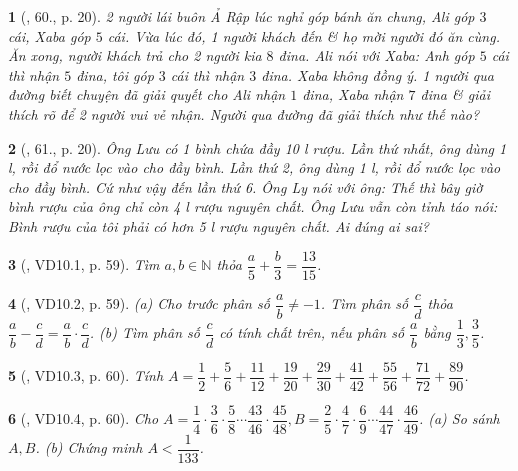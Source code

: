 \documentclass{article}
\newtheorem{baitoan}{}
\begin{document}
\begin{baitoan}[\cite{Binh_Toan_6_tap_2}, 60., p. 20]
	2 người lái buôn Ả Rập lúc nghỉ góp bánh ăn chung, Ali góp $3$ cái, Xaba góp $5$ cái. Vừa lúc đó, 1 người khách đến \& họ mời người đó ăn cùng. Ăn xong, người khách trả cho 2 người kia $8$ đina. Ali nói với Xaba: Anh góp $5$ cái thì nhận $5$ đina, tôi góp $3$ cái thì nhận $3$ đina. Xaba không đồng ý. 1 người qua đường biết chuyện đã giải quyết cho Ali nhận $1$ đina, Xaba nhận $7$ đina \& giải thích rõ để 2 người vui vẻ nhận. Người qua đường đã giải thích như thế nào?
\end{baitoan}

\begin{baitoan}[\cite{Binh_Toan_6_tap_2}, 61., p. 20]
	Ông Lưu có 1 bình chứa đầy {\rm10 l} rượu. Lần thứ nhất, ông dùng {\rm1 l}, rồi đổ nước lọc vào cho đầy bình. Lần thứ 2, ông dùng {\rm1 l}, rồi đổ nước lọc vào cho đầy bình. Cứ như vậy đến lần thứ 6. Ông Ly nói với ông: Thế thì bây giờ bình rượu của ông chỉ còn {\rm4 l} rượu nguyên chất. Ông Lưu vẫn còn tỉnh táo nói: Bình rượu của tôi phải có hơn {\rm5 l} rượu nguyên chất. Ai đúng ai sai?
\end{baitoan}

\begin{baitoan}[\cite{TLCT_THCS_Toan_6_so_hoc}, VD10.1, p. 59]
	Tìm $a,b\in\mathbb{N}$ thỏa $\dfrac{a}{5} + \dfrac{b}{3} = \dfrac{13}{15}$.
\end{baitoan}

\begin{baitoan}[\cite{TLCT_THCS_Toan_6_so_hoc}, VD10.2, p. 59]
	(a) Cho trước phân số $\dfrac{a}{b}\ne-1$. Tìm phân số $\dfrac{c}{d}$ thỏa $\dfrac{a}{b} - \dfrac{c}{d} = \dfrac{a}{b}\cdot\dfrac{c}{d}$. (b) Tìm phân số $\dfrac{c}{d}$ có tính chất trên, nếu phân số $\dfrac{a}{b}$ bằng $\dfrac{1}{3},\dfrac{3}{5}$.
\end{baitoan}

\begin{baitoan}[\cite{TLCT_THCS_Toan_6_so_hoc}, VD10.3, p. 60]
	Tính $A = \dfrac{1}{2} + \dfrac{5}{6} + \dfrac{11}{12} + \dfrac{19}{20} + \dfrac{29}{30} + \dfrac{41}{42} + \dfrac{55}{56} + \dfrac{71}{72} + \dfrac{89}{90}$.
\end{baitoan}

\begin{baitoan}[\cite{TLCT_THCS_Toan_6_so_hoc}, VD10.4, p. 60]
	Cho $A = \dfrac{1}{4}\cdot\dfrac{3}{6}\cdot\dfrac{5}{8}\cdots\dfrac{43}{46}\cdot\dfrac{45}{48},B = \dfrac{2}{5}\cdot\dfrac{4}{7}\cdot\dfrac{6}{9}\cdots\dfrac{44}{47}\cdot\dfrac{46}{49}$. (a) So sánh $A,B$. (b) Chứng minh $A < \dfrac{1}{133}$.
\end{baitoan}
\end{document}
